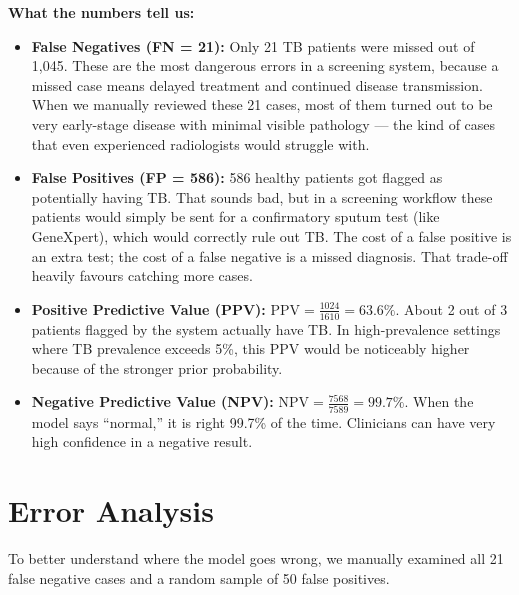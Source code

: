 \documentclass[12pt]{report}
\begin{document}
\textbf{What the numbers tell us:}
\begin{itemize}
    \item \textbf{False Negatives (FN = 21):} Only 21 TB patients were missed out of 1,045. These are the most dangerous errors in a screening system, because a missed case means delayed treatment and continued disease transmission. When we manually reviewed these 21 cases, most of them turned out to be very early-stage disease with minimal visible pathology --- the kind of cases that even experienced radiologists would struggle with.

    \item \textbf{False Positives (FP = 586):} 586 healthy patients got flagged as potentially having TB. That sounds bad, but in a screening workflow these patients would simply be sent for a confirmatory sputum test (like GeneXpert), which would correctly rule out TB. The cost of a false positive is an extra test; the cost of a false negative is a missed diagnosis. That trade-off heavily favours catching more cases.

    \item \textbf{Positive Predictive Value (PPV):} $\text{PPV} = \frac{1024}{1610} = 63.6\%$. About 2 out of 3 patients flagged by the system actually have TB. In high-prevalence settings where TB prevalence exceeds 5\%, this PPV would be noticeably higher because of the stronger prior probability.

    \item \textbf{Negative Predictive Value (NPV):} $\text{NPV} = \frac{7568}{7589} = 99.7\%$. When the model says ``normal,'' it is right 99.7\% of the time. Clinicians can have very high confidence in a negative result.
\end{itemize}

\section{Error Analysis}

To better understand where the model goes wrong, we manually examined all 21 false negative cases and a random sample of 50 false positives.
\end{document}
